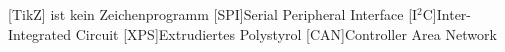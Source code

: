 
\begin{acronym}[ACRONYM]
[TikZ]{\TikZ{} ist kein Zeichenprogramm}
[SPI]{Serial Peripheral Interface}
[I$^2$C]{Inter-Integrated Circuit}
[XPS]{Extrudiertes Polystyrol}
[CAN]{Controller Area Network}
\end{acronym}\newpage

